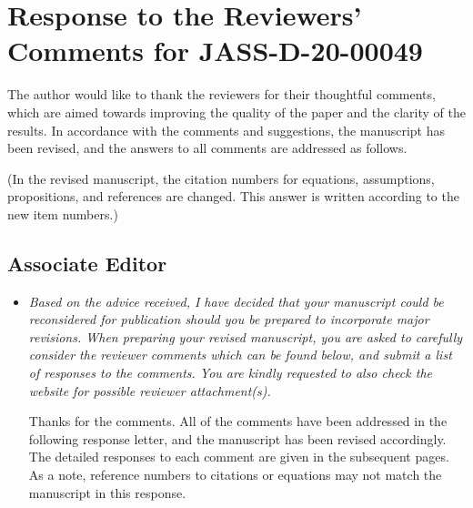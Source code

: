 \documentclass[11pt]{article}
\newcommand{\comment}[1]{\item \itshape #1 \normalfont}
\begin{document}

\section*{Response to the Reviewers' Comments for JASS-D-20-00049}

The author would like to thank the reviewers for their thoughtful comments, which are aimed towards improving the quality of the paper and the clarity of the results.
In accordance with the comments and suggestions, the manuscript has been revised, and the answers to all comments are addressed as follows.

(In the revised manuscript, the citation numbers for equations, assumptions, propositions, and references are changed. This answer is written according to the new item numbers.)

\subsection*{Associate Editor}

\setlength{\leftmargini}{0pt}
\begin{itemize}\setlength{\itemsep}{2\parsep}

\comment{
    Based on the advice received, I have decided that your manuscript could be reconsidered for publication should you be prepared to incorporate major revisions. 
    When preparing your revised manuscript, you are asked to carefully consider the reviewer comments which can be found below, and submit a list of responses to the comments. 
    You are kindly requested to also check the website for possible reviewer attachment(s).
}

Thanks for the comments. All of the comments have been addressed in the following response letter, and the manuscript has been revised accordingly. 
The detailed responses to each comment are given in the subsequent pages.  
As a note, reference numbers to citations or equations may not match the manuscript in this response.

\end{itemize}

\clearpage\newpage
\end{document}
